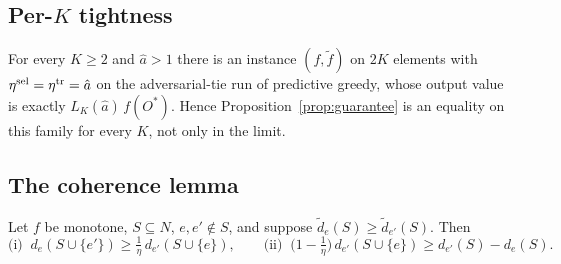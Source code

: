 \subsection{Per-$K$ tightness}\label{sec:tightness}

\begin{theorem}\label{thm:tightness}
For every $K\ge2$ and $\hat a>1$ there is an instance $(f,\tilde f)$ on
$2K$ elements with $\eta^{\mathrm{sel}}=\eta^{\mathrm{tr}}=\hat a$ on the adversarial-tie run of
predictive greedy, whose output value is exactly $L_K(\hat a)\,f(O^{\ast})$.
Hence Proposition~\ref{prop:guarantee} is an equality on this family for every
$K$, not only in the limit.
\end{theorem}

\subsection{The coherence lemma}\label{sec:coherence}

\begin{lemma}[Coherence]\label{lem:coherence}
Let $f$ be monotone, $S\subseteq N$, $e,e'\notin S$, and suppose
$\tilde d_{e}(S)\ge\tilde d_{e'}(S)$.  Then
\[
  \text{(i)}\;\; d_{e}(S\cup\{e'\})\ge\tfrac1\eta\,d_{e'}(S\cup\{e\}),
  \qquad
  \text{(ii)}\;\;\bigl(1-\tfrac1\eta\bigr)\,d_{e'}(S\cup\{e\})
  \ge d_{e'}(S)-d_{e}(S).
\]
\end{lemma}

